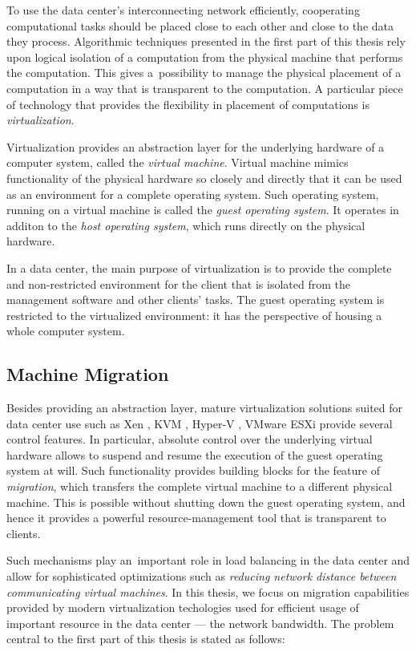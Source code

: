 To use the data center's interconnecting network efficiently, cooperating computational tasks should be placed close to each other and close to the data they process.
Algorithmic techniques presented in the first part of this thesis rely upon logical isolation of a computation from the physical machine that performs the computation.
This gives a~possibility to manage the physical placement of a computation in a way that is transparent to the computation.
A particular piece of technology that provides the flexibility in placement of computations is \emph{virtualization}.

Virtualization provides an abstraction layer for the underlying hardware of a computer system, called the \emph{virtual machine}.
Virtual machine mimics functionality of the physical hardware so closely and
directly that it can be used as an environment for a complete operating system.
Such operating system, running on a virtual machine is called the \emph{guest
operating system}. It operates in additon to the \emph{host operating
system}, which runs directly on the physical hardware. 

In a data center, the main purpose of virtualization is to provide the complete and non-restricted environment for the client that is isolated from the management software and other clients' tasks.
The guest operating system is restricted to the virtualized environment: it has the perspective of housing a whole computer system.


\subsection{Machine Migration}

Besides providing an abstraction layer, mature virtualization solutions suited for data center use such as Xen
\cite{url-xen}, KVM \cite{url-kvm}, Hyper-V \cite{url-hyperv}, VMware ESXi
\cite{url-vmware} provide several control features.
In particular, absolute control over the underlying virtual hardware allows to suspend and resume the execution of the guest operating system at will.
Such functionality provides building blocks for the feature of \emph{migration}, which transfers the complete virtual machine to a different physical machine.
This is possible without shutting down the guest operating system, and hence it provides a powerful resource-management tool that is transparent to clients.

Such mechanisms play an~important role in load balancing in the data center and allow for sophisticated optimizations such as \emph{reducing network distance between communicating virtual machines}.
In this thesis, we focus on migration capabilities provided by modern virtualization techologies used for efficient usage of important resource in the data center --- the network bandwidth.
The problem central to the first part of this thesis is stated as follows:

